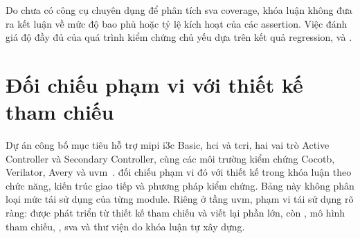Do chưa có công cụ chuyên dụng để phân tích \gls{sva} coverage, khóa luận không
đưa ra kết luận về mức độ bao phủ hoặc tỷ lệ kích hoạt của các assertion. Việc
đánh giá độ đầy đủ của quá trình kiểm chứng chủ yếu dựa trên kết quả regression,
\Scoreboard{} và \FunctionalCoverage{}.

\section{Đối chiếu phạm vi với thiết kế tham chiếu}
\label{sec:res-reference-comparison}

Dự án \CHIPSAlliance{} \IThreeCCore{} công bố mục tiêu hỗ trợ \gls{mipi} \gls{i3c} Basic, \gls{hci} và \gls{tcri},
hai vai trò Active Controller và Secondary Controller, cùng các môi trường kiểm chứng Cocotb,
Verilator, Avery và
\gls{uvm}~\cite{chipsalliance_i3c}.  đối chiếu phạm vi đó với thiết kế
trong khóa luận theo chức năng, kiến trúc giao tiếp và phương pháp kiểm chứng. Bảng này không phân loại mức tái sử dụng của từng module. Riêng ở tầng \gls{uvm}, phạm vi tái sử dụng rõ ràng: \IThreeCAgent{} được phát triển từ thiết kế tham chiếu và viết lại phần lớn, còn \Scoreboard{}, mô hình tham chiếu, \RegisterAgent{}, \gls{sva} và thư viện \VirtualSequence{} do khóa luận tự xây dựng.

